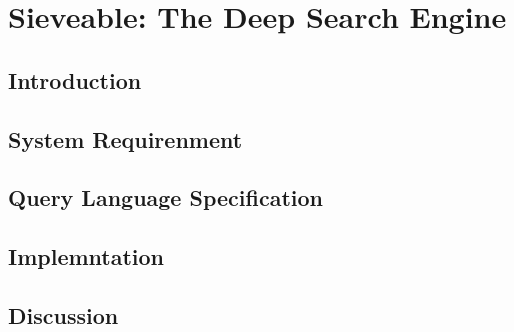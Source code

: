 \chapter{Sieveable: The Deep Search Engine}
\label{sieveable_chapter}

\section{Introduction}

\section{System Requirenment}

\section{Query Language Specification}

\section{Implemntation}

\section{Discussion}
